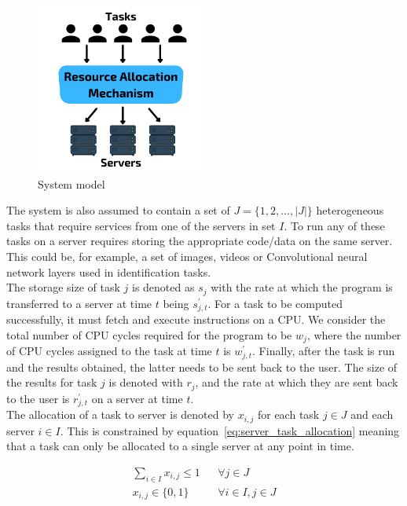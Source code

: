 \begin{figure}
    \centering
    \includegraphics[width=0.5\textwidth]{figures/2_solution_figs/system_model.pdf}
    \caption{System model}
    \label{fig:system_model}
\end{figure}

The system is also assumed to contain a set of $J = \{1,2,\ldots,\left| J \right|\}$ heterogeneous tasks that require
services from one of the servers in set $I$. To run any of these tasks on a server requires storing the appropriate
code/data on the same server. This could be, for example, a set of images, videos or Convolutional neural network
layers used in identification tasks.\\
The storage size of task $j$ is denoted as $s_j$ with the rate at which the program is transferred to a server at time
$t$ being $s^{'}_{j,t}$. For a task to be computed successfully, it must fetch and execute instructions
on a CPU. We consider the total number of CPU cycles required for the program to be $w_j$, where the number of
CPU cycles assigned to the task at time $t$ is $w^{'}_{j,t}$. Finally, after the task is run and
the results obtained, the latter needs to be sent back to the user. The size of the results for task $j$ is denoted with
$r_j$, and the rate at which they are sent back to the user is $r^{'}_{j,t}$ on a server at time $t$. \\
The allocation of a task to server is denoted by $x_{i,j}$ for each task $j \in J$ and each server $i \in I$. This is
constrained by equation~\eqref{eq:server_task_allocation} meaning that a task can only be allocated to a single server
at any point in time.

\begin{align}
    \sum_{i \in I} x_{i,j} \leq 1 && \forall{j \in J} \label{eq:server_task_allocation} \\
    x_{i,j} \in \{0, 1\} && \forall{i \in I, j \in J} \label{eq:server_task_binary}
\end{align}

